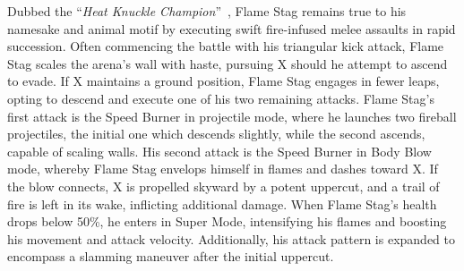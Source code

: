 Dubbed the ``\textit{Heat Knuckle Champion}''~\cite{book:MMX_Complete_art}, Flame Stag remains true to his namesake and animal motif by executing swift fire-infused melee assaults in rapid succession. Often commencing the battle with his triangular kick attack, Flame Stag scales the arena's wall with haste, pursuing X should he attempt to ascend to evade. If X maintains a ground position, Flame Stag engages in fewer leaps, opting to descend and execute one of his two remaining attacks. Flame Stag's first attack is the Speed Burner in projectile mode, where he launches two fireball projectiles, the initial one which descends slightly, while the second ascends, capable of scaling walls. His second attack is the Speed Burner in Body Blow mode, whereby Flame Stag envelops himself in flames and dashes toward X. If the blow connects, X is propelled skyward by a potent uppercut, and a trail of fire is left in its wake, inflicting additional damage. When Flame Stag's health drops below 50\%, he enters in Super Mode, intensifying his flames and boosting his movement and attack velocity. Additionally, his attack pattern is expanded to encompass a slamming maneuver after the initial uppercut.

